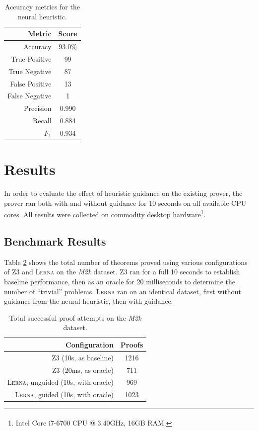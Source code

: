\documentclass[runningheads]{llncs}
\newcommand{\lerna}{\textsc{Lerna}}
\newcommand{\z}[1]{\textsc{Z3}}
\newcommand{\mizarsmall}{\textit{M2k}}
\begin{document}
\begin{table}
	\caption{Accuracy metrics for the neural heuristic.}
	\centering
	\begin{tabular}{r | c}
		\textbf{Metric} & \textbf{Score}\\
		\hline
		Accuracy & 93.0\%\\
		True Positive&99\\
		True Negative&87\\
		False Positive&13\\
		False Negative&1\\
		Precision&0.990\\
		Recall&0.884\\
		\(F_1\)&0.934\\
	\end{tabular}
	\label{table:network-evaluation}
\end{table}

\section{Results}
\label{section:results}
In order to evaluate the effect of heuristic guidance on the existing prover, the prover ran both with and without guidance for 10 seconds on all available CPU cores.
All results were collected on commodity desktop hardware\footnote{Intel\textsuperscript{\textregistered} Core\textsuperscript{\texttrademark} i7-6700 CPU @ 3.40GHz, 16GB RAM.}.

\subsection{Benchmark Results}
Table \ref{table:m2k-results} shows the total number of theorems proved using various configurations of \z3 and \lerna{} on the \mizarsmall{} dataset.
\z3 ran for a full 10 seconds to establish baseline performance, then as an oracle for 20 milliseconds to determine the number of ``trivial'' problems.
\lerna{} ran on an identical dataset, first without guidance from the neural heuristic, then with guidance.

\begin{table}
	\caption{Total successful proof attempts on the \mizarsmall{} dataset.}
	\centering
	\begin{tabular}{r | c}
		\textbf{Configuration} & \textbf{Proofs}\\
		\hline
		\z3 (10s, as baseline) & 1216\\
		\z3 (20ms, as oracle) & 711\\
		\lerna{}, unguided (10s, with oracle) & 969\\
		\lerna{}, guided (10s, with oracle) & 1023\\
	\end{tabular}
	\label{table:m2k-results}
\end{table}
\end{document}
